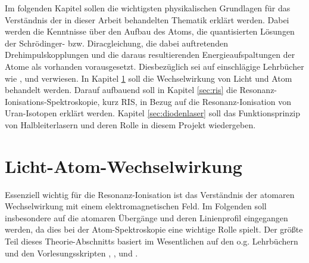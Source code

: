 Im folgenden Kapitel sollen die wichtigsten physikalischen Grundlagen für das
Verständnis der in dieser Arbeit behandelten Thematik erklärt werden. Dabei
werden die Kenntnisse über den Aufbau des Atoms, die quantisierten Lösungen der
Schrödinger- bzw. Diracgleichung, die dabei auftretenden Drehimpulskopplungen
und die daraus resultierenden Energieaufspaltungen der Atome als vorhanden
vorausgesetzt. Diesbezüglich sei auf einschlägige Lehrbücher wie
\cite{demtroeder:ex3}, \cite{demtroeder:laserspektroskopie} und \cite{saleh:grundlagen_der_photonik}
verwiesen. In Kapitel \ref{sec:licht-atom-wechselwirkung} soll die
Wechselwirkung von Licht und Atom behandelt werden. Darauf aufbauend soll
in Kapitel \ref{sec:ris} die Resonanz-Ionisations-Spektroskopie,
kurz RIS, in Bezug auf die Resonanz-Ionisation von Uran-Isotopen erklärt
werden. Kapitel \ref{sec:diodenlaser} soll das Funktionsprinzip von
Halbleiterlasern und deren Rolle in diesem Projekt wiedergeben.

\section{Licht-Atom-Wechselwirkung}\label{sec:licht-atom-wechselwirkung}
Essenziell wichtig für die Resonanz-Ionisation ist das Verständnis der atomaren
Wechselwirkung mit einem elektromagnetischen Feld. Im Folgenden soll insbesondere auf die
atomaren Übergänge und deren Linienprofil eingegangen werden, da dies bei der
Atom-Spektroskopie eine wichtige Rolle spielt. Der größte Teil dieses
Theorie-Abschnitts basiert im Wesentlichen auf den o.g. Lehrbüchern und den
Vorlesungsskripten \cite{bloch:atomphysik},
\cite{rauschenbeutel:atomphysik}, \cite{rauschenbeutel:quantenoptik} und
\cite{kuhr:quantenoptik}.



